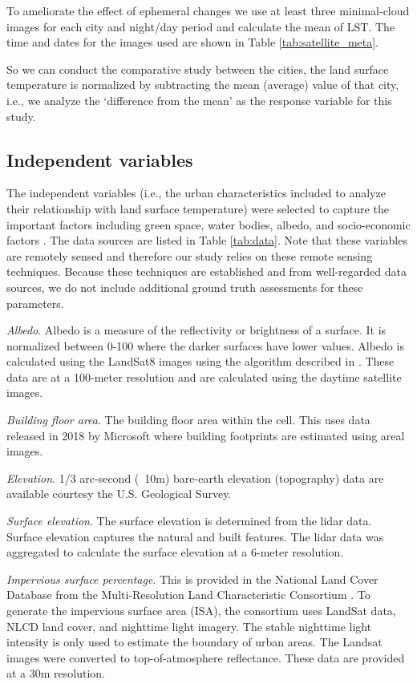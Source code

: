 \documentclass[final,3p,times,onecolumn,sort&compress]{elsarticle}
\begin{document}
To ameliorate the effect of ephemeral changes \citep{Zhou2018-iy} we use at least three minimal-cloud images for each city and night/day period and calculate the mean of LST.
The time and dates for the images used are shown in Table \ref{tab:satellite_meta}.

So we can conduct the comparative study between the cities, the land surface temperature is normalized by subtracting the mean (average) value of that city, i.e., we analyze the `difference from the mean' as the response variable for this study.

\subsection{Independent variables}
The independent variables (i.e., the urban characteristics included to analyze their relationship with land surface temperature) were selected to capture the important factors including green space, water bodies, albedo, and socio-economic factors \citep{Peng2018-cp}. 
The data sources are listed in Table \ref{tab:data}.
Note that these variables are remotely sensed and therefore our study relies on these remote sensing techniques.
Because these techniques are established and from well-regarded data sources, we do not include additional ground truth assessments for these parameters.

\textit{Albedo}. 
Albedo is a measure of the reflectivity or brightness of a surface. 
It is normalized between 0-100 where the darker surfaces have lower values. 
Albedo is calculated using the LandSat8 images using the algorithm described in \cite{Smith2010-nw, Liang2001-jd}. 
These data are at a 100-meter resolution and are calculated using the daytime satellite images.

\textit{Building floor area}. 
The building floor area within the cell. 
This uses data released in 2018 by Microsoft where building footprints are estimated using areal images. 

\textit{Elevation}. 
1/3 arc-second (~10m) bare-earth elevation (topography) data are available courtesy the U.S. Geological Survey. 

\textit{Surface elevation}. 
The surface elevation is determined from the lidar data. 
Surface elevation captures the natural and built features. 
The lidar data was aggregated to calculate the surface elevation at a 6-meter resolution.

\textit{Impervious surface percentage}. 
This is provided in the National Land Cover Database from the Multi-Resolution Land Characteristic Consortium \citep{Xian2011-aa}. 
To generate the impervious surface area (ISA), the consortium uses LandSat data, NLCD land cover, and nighttime light imagery. 
The stable nighttime light intensity is only used to estimate the boundary of urban areas. 
The Landsat images were converted to top-of-atmosphere reflectance. 
These data are provided at a 30m resolution.
\end{document}
